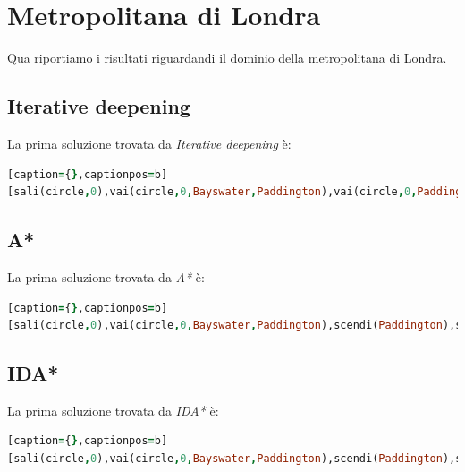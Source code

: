 \documentclass[12pt]{report}
\begin{document}
\section{Metropolitana di Londra}
Qua riportiamo i risultati riguardandi il dominio della metropolitana di Londra.

\subsection{Iterative deepening}
La prima soluzione trovata da \emph{Iterative deepening} è:

\begin{lstlisting}[language=Prolog][caption={},captionpos=b]
[sali(circle,0),vai(circle,0,Bayswater,Paddington),vai(circle,0,Paddington,Baker Street),vai(circle,0,Baker Street,Kings Cross),scendi(Kings Cross),sali(piccadilly,0),vai(piccadilly,0,Kings Cross,Holborn),vai(piccadilly,0,Holborn,Covent Garden),scendi(Covent Garden)]
\end{lstlisting}

\subsection{A*}
La prima soluzione trovata da \emph{A*} è:

\begin{lstlisting}[language=Prolog][caption={},captionpos=b]
[sali(circle,0),vai(circle,0,Bayswater,Paddington),scendi(Paddington),sali(bakerloo,0),vai(bakerloo,0,Paddington,Baker Street),vai(bakerloo,0,Baker Street,Oxford Circus),vai(bakerloo,0,Oxford Circus,Piccadilly Circus),scendi(Piccadilly Circus),sali(piccadilly,1),vai(piccadilly,1,Piccadilly Circus,Leicester Square),vai(piccadilly,1,Leicester Square,Covent Garden),scendi(Covent Garden)]
\end{lstlisting}

\subsection{IDA*}
La prima soluzione trovata da \emph{IDA*} è:

\begin{lstlisting}[language=Prolog][caption={},captionpos=b]
[sali(circle,0),vai(circle,0,Bayswater,Paddington),scendi(Paddington),sali(bakerloo,0),vai(bakerloo,0,Paddington,Baker Street),vai(bakerloo,0,Baker Street,Oxford Circus),vai(bakerloo,0,Oxford Circus,Piccadilly Circus),scendi(Piccadilly Circus),sali(piccadilly,1),vai(piccadilly,1,Piccadilly Circus,Leicester Square),vai(piccadilly,1,Leicester Square,Covent Garden),scendi(Covent Garden)]
\end{lstlisting}
\end{document}
